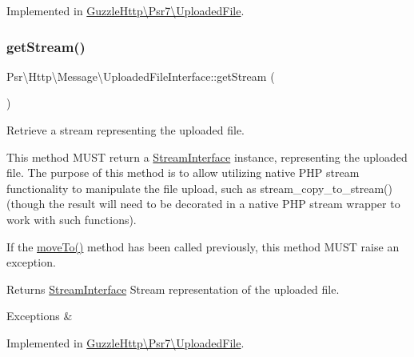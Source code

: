 Implemented in \hyperlink{classGuzzleHttp_1_1Psr7_1_1UploadedFile_ac21d09bd109893eb961d927e96693079}{Guzzle\+Http\textbackslash{}\+Psr7\textbackslash{}\+Uploaded\+File}.

\mbox{\label{interfacePsr_1_1Http_1_1Message_1_1UploadedFileInterface_a342c7814f65c2b256dc525bc3063d662}} 
\subsubsection{\texorpdfstring{get\+Stream()}{getStream()}}
{\footnotesize\ttfamily Psr\textbackslash{}\+Http\textbackslash{}\+Message\textbackslash{}\+Uploaded\+File\+Interface\+::get\+Stream (\begin{DoxyParamCaption}{ }\end{DoxyParamCaption})}

Retrieve a stream representing the uploaded file.

This method M\+U\+ST return a \hyperlink{interfacePsr_1_1Http_1_1Message_1_1StreamInterface}{Stream\+Interface} instance, representing the uploaded file. The purpose of this method is to allow utilizing native P\+HP stream functionality to manipulate the file upload, such as stream\+\_\+copy\+\_\+to\+\_\+stream() (though the result will need to be decorated in a native P\+HP stream wrapper to work with such functions).

If the \hyperlink{interfacePsr_1_1Http_1_1Message_1_1UploadedFileInterface_aac862c26ca280245c0fb197d0266fdf4}{move\+To()} method has been called previously, this method M\+U\+ST raise an exception.

\begin{DoxyReturn}{Returns}
\hyperlink{interfacePsr_1_1Http_1_1Message_1_1StreamInterface}{Stream\+Interface} Stream representation of the uploaded file. 
\end{DoxyReturn}

\begin{DoxyExceptions}{Exceptions}
{\em } & \\
\hline
\end{DoxyExceptions}


Implemented in \hyperlink{classGuzzleHttp_1_1Psr7_1_1UploadedFile_a4626779cebe28308009f37701ad0d982}{Guzzle\+Http\textbackslash{}\+Psr7\textbackslash{}\+Uploaded\+File}.


